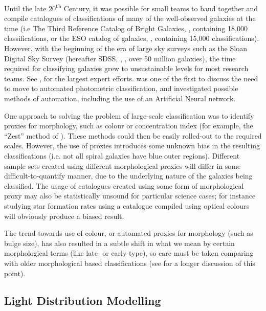 \documentclass[../main.tex]{subfiles}
\begin{document}
Until the late 20\textsuperscript{th} Century, it was possible for small teams to band together and compile catalogues of classifications of many of the well-observed galaxies at the time (i.e The Third Reference Catalog of Bright Galaxies, \citealt{deVaucouleurs1991}, containing 18,000 classifications, or the ESO catalog of galaxies, \citealt{1989Msngr..56...31L}, containing 15,000 classifications). However, with the beginning of the era of large sky surveys such as the Sloan Digital Sky Survey (hereafter SDSS, \citealt{2017AJ....154...28B}, \citealt{SDSSDR7}, over 50 million galaxies), the time required for classifying galaxies grew to unsustainable levels for most research teams. See \citet{2010yCat..21860427N}, \citet{2007ApJS..173..512S} for the largest expert efforts. \citet{Naim1995:astro-ph/9502078v1} was one of the first to discuss the need to move to automated photometric classification, and investigated possible methods of automation, including the use of an Artificial Neural network.

One approach to solving the problem of large-scale classification was to identify proxies for morphology, such as colour or concentration index (for example, the ``Zest'' method of  \citet{Scarlata2007:astro-ph/0701746v2}). These methods could then be easily rolled-out to the required scales. However, the use of proxies introduces some unknown bias in the resulting classifications (i.e. not all spiral galaxies have blue outer regions). Different sample sets created using different morphological proxies will differ in some difficult-to-quantify manner, due to the underlying nature of the galaxies being classified. The usage of catalogues created using some form of morphological proxy may also be statistically unsound for particular science cases; for instance studying star formation rates using a catalogue compiled using optical colours will obviously produce a biased result.

The trend towards use of colour, or automated proxies for morphology (such as bulge size), has also resulted in a subtle shift in what we mean by certain morphological terms (like late- or early-type), so care must be taken comparing with older morphological based classifications (see \citealt{Masters2019:1904.11436v1} for a longer discussion of this point).


\subsection{Light Distribution Modelling}
\end{document}
